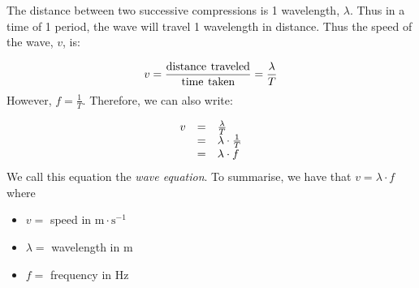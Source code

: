    
        \label{m38806*id319706}The distance between two successive compressions is 1 wavelength, $\lambda$. Thus in a time of 1 period, the wave will travel 1 wavelength in distance. Thus the speed of the wave, $v$, is:\par 
        \label{m38806*id319732}\nopagebreak\noindent{}
    \begin{equation*}
    v=\frac{\text{distance}\phantom{\rule{4.pt}{0ex}}\text{traveled}}{\text{time}\phantom{\rule{4.pt}{0ex}}\text{taken}}=\frac{\lambda }{T}
      \end{equation*}
        \label{m38806*id319776}However, $f=\frac{1}{T}$. Therefore, we can also write:\par 
        \label{m38806*id319802}\nopagebreak\noindent{}
          
    \begin{equation*}
    \begin{array}{ccc}\hfill v& =& \frac{\lambda }{T}\hfill \\ & =& \lambda \ensuremath{\cdot}\frac{1}{T}\hfill \\ & =& \lambda \ensuremath{\cdot}f\hfill \end{array}
      \end{equation*}
        \label{m38806*id319870}We call this equation the \textsl{wave equation}. To summarise, we have that $v=\lambda \ensuremath{\cdot}f$ where\par 
        \label{m38806*id319901}\begin{itemize}[noitemsep]
            \label{m38806*uid22}\item $v=$ speed in $\text{m}\ensuremath{\cdot}\text{s}{}^{-1}$\label{m38806*uid23}\item $\lambda =$ wavelength in $\text{m}$
\item $f=$ frequency in $\text{Hz}$
\end{itemize}
\par

